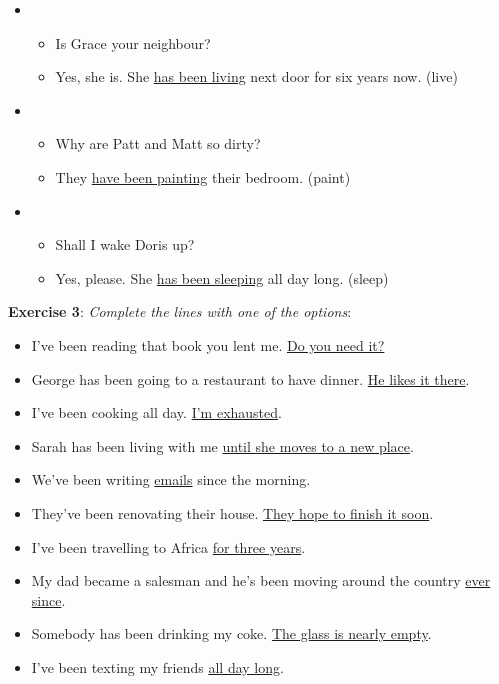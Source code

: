 \begin{itemize}
\item
\begin{itemize}
\item Is Grace your neighbour?
\item Yes, she is. She \underline{has been living} next door for six years now. (live)
\end{itemize}

\item
\begin{itemize}
\item Why are Patt and Matt so dirty?
\item They \underline{have been painting} their bedroom. (paint)
\end{itemize}

\item
\begin{itemize}
\item Shall I wake Doris up?
\item Yes, please. She \underline{has been sleeping} all day long. (sleep)
\end{itemize}

\end{itemize}

\textbf{Exercise 3}: \textit{Complete the lines with one of the options}:

\begin{itemize}

\item I've been reading that book you lent me. \underline{Do you need it?}
\item George has been going to a restaurant to have dinner. \underline{He likes it there}.
\item I've been cooking all day. \underline{I'm exhausted}.
\item Sarah has been living with me \underline{until she moves to a new place}.
\item We've been writing \underline{emails} since the morning.
\item They've been renovating their house. \underline{They hope to finish it soon}.
\item I've been travelling to Africa \underline{for three years}.
\item My dad became a salesman and he's been moving around the country \underline{ever since}.
\item Somebody has been drinking my coke. \underline{The glass is nearly empty}.
\item I've been texting my friends \underline{all day long}.

\end{itemize}

